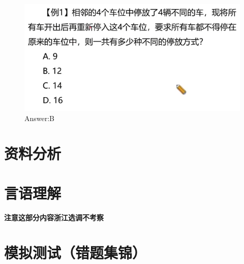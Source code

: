 \documentclass{article}
\numberwithin{equation}{section}						%
\numberwithin{figure}{section}							%
\begin{document}
\begin{sloppypar}
\begin{figure}[H]
     \centering
     \includegraphics[width=0.6\linewidth]{294.png}
		\caption{Answer:B}
\end{figure}

















\section{资料分析}











































\section{言语理解}


\textbf{注意这部分内容浙江选调不考察}









\section{模拟测试（错题集锦）}



\end{sloppypar}
\end{document}
